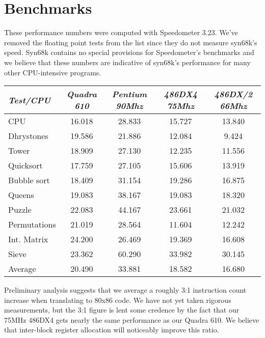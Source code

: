 \section{Benchmarks}

These performance numbers were computed with Speedometer 3.23.
We've removed the floating point tests from the list since they do
not measure syn68k's speed.  Syn68k contains no special provisions
for Speedometer's benchmarks and we believe that these numbers are
indicative of syn68k's performance for many other CPU-intensive
programs.

\begin{center}
\begin{tabular}{||l||c|c|c|c||} \hline \hline
\em{\small{Test/CPU}} & \em{\small{Quadra 610}} & \em{\small{Pentium 90Mhz}} 
	& \em{\small{486DX4 75Mhz}} & \em{\small{486DX/2 66Mhz}} \\ \hline \hline

CPU & 16.018 & 28.833 & 15.727 & 13.840 \\ \hline
Dhrystones & 19.586 & 21.886 & 12.084 & 9.424 \\ \hline
Tower &	18.909 & 27.130 & 12.235 & 11.556 \\ \hline
Quicksort & 17.759 & 27.105 & 15.606 & 13.919 \\ \hline
Bubble sort & 18.409 & 31.154 & 19.286 & 16.875 \\ \hline
Queens & 19.083 & 38.167 & 19.083 & 18.320 \\ \hline
Puzzle & 22.083 & 44.167 & 23.661 & 21.032 \\ \hline
Permutations & 21.019 & 28.564 & 11.604 & 12.242 \\ \hline
Int. Matrix & 24.200 & 26.469 & 19.369 & 16.608 \\ \hline
Sieve & 23.362 & 60.290 & 33.982 & 30.145 \\ \hline \hline
Average	& 20.490 & 33.881 & 18.582 & 16.680 \\ \hline
\end{tabular}
\end{center}

Preliminary analysis suggests that we average a roughly 3:1
instruction count increase when translating to 80x86 code.  We have
not yet taken rigorous measurements, but the 3:1 figure is lent
some credence by the fact that our 75MHz 486DX4 gets nearly the
same performance as our Quadra 610.  We believe that inter-block
register allocation will noticeably improve this ratio.


